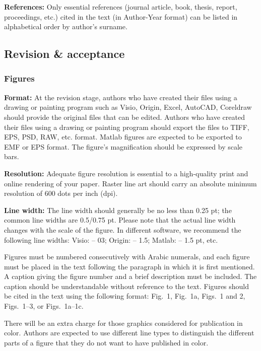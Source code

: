 \documentclass[twoside,twocolumn]{article}
\begin{document}
\noindent \textbf{References:} Only essential references (journal article, book, thesis, report, proceedings, etc.) cited in the text (in Author-Year format) can be listed in alphabetical order by author's surname.


\subsection{Revision \& acceptance}

\subsubsection{Figures}\label{sec:figure}

\noindent \textbf{Format:} At the revision stage, authors who have created their files using a drawing or painting program such as Visio, Origin, Excel, AutoCAD, Coreldraw should provide the original files that can be edited. Authors who have created their files using a drawing or painting program should export the files to TIFF, EPS, PSD, RAW, etc. format. Matlab figures are expected to be exported to EMF or EPS format. The figure's magnification should be expressed by scale bars.

\noindent \textbf{Resolution:} Adequate figure resolution is essential to a high-quality print and online rendering of your paper. Raster line art should carry an absolute minimum resolution of 600 dots per inch (dpi).

\noindent \textbf{Line width:} The line width should generally be no less than 0.25 pt; the common line widths are 0.5/0.75 pt. Please note that the actual line width changes with the scale of the figure. In different software, we recommend the following line widths: Visio: -- 03; Origin: -- 1.5; Matlab: -- 1.5 pt, etc.

Figures must be numbered consecutively with Arabic numerals, and each figure must be placed in the text following the paragraph in which it is first mentioned. A caption giving the figure number and a brief description must be included. The caption should be understandable without reference to the text. Figures should be cited in the text using the following format: Fig.~1, Fig.~1a, Figs.~1 and 2, Figs.~1--3, or Figs.~1a--1c.

There will be an extra charge for those graphics considered for publication in color. Authors are expected to use different line types to distinguish the different parts of a figure that they do not want to have published in color.
\end{document}
